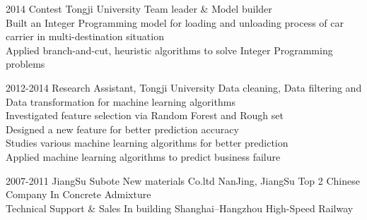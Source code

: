 \documentclass[]{friggeri-cv} %
\begin{document}
\begin{entrylist}
\entry
{2014}
{Contest }
{Tongji University}
{Team leader \& Model builder \\
Built an Integer Programming model for loading and unloading process of car carrier in multi-destination situation\\
Applied branch-and-cut, heuristic algorithms to solve Integer Programming problems
}

\entry
{2012-2014}
{Research Assistant, }
{Tongji University}
{Data cleaning, Data filtering and Data transformation for machine learning algorithms\\
 Investigated feature selection via Random Forest and Rough set\\
 Designed a new feature for better prediction accuracy\\
 Studies various machine learning algorithms for better prediction\\
 Applied machine learning algorithms to predict business failure
}



\entry
{2007-2011}
{JiangSu Subote New materials Co.ltd}
{NanJing, JiangSu}
{Top 2 Chinese Company In Concrete Admixture\\
Technical Support \& Sales In building Shanghai–Hangzhou High-Speed Railway}




\end{entrylist}
\end{document}
